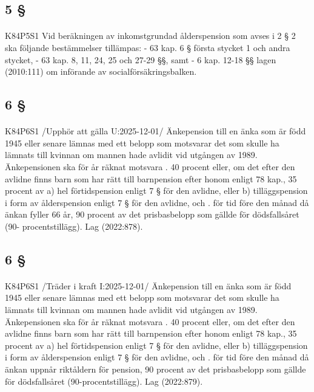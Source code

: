 \documentclass[a4paper,notitlepage,openany,10pt]{book}
\begin{document}
\subsection*{5 §}
\paragraph*{}
{\tiny K84P5S1}
Vid beräkningen av inkomstgrundad ålderspension som avses i 2 § 2 ska följande bestämmelser tillämpas:
\newline - 63 kap. 6 § första stycket 1 och andra stycket,
\newline - 63 kap. 8, 11, 24, 25 och 27-29 §§, samt
\newline - 6 kap. 12-18 §§ lagen (2010:111) om införande av socialförsäkringsbalken.
\subsection*{6 §}
\paragraph*{}
{\tiny K84P6S1}
/Upphör att gälla U:2025-12-01/
Änkepension till en änka som är född 1945 eller senare lämnas med ett belopp som motsvarar det som skulle ha lämnats till kvinnan om mannen hade avlidit vid utgången av 1989. Änkepensionen ska för år räknat motsvara
. 40 procent eller, om det efter den avlidne finns barn som har rätt till barnpension efter honom enligt 78 kap., 35 procent av
a) hel förtidspension enligt 7 § för den avlidne, eller
b) tilläggspension i form av ålderspension enligt 7 § för den avlidne, och
. för tid före den månad då änkan fyller 66 år, 90 procent av det prisbasbelopp som gällde för dödsfallsåret (90- procentstillägg).
Lag (2022:878).
\subsection*{6 §}
\paragraph*{}
{\tiny K84P6S1}
/Träder i kraft I:2025-12-01/
Änkepension till en änka som är född 1945 eller senare lämnas med ett belopp som motsvarar det som skulle ha lämnats till kvinnan om mannen hade avlidit vid utgången av 1989. Änkepensionen ska för år räknat motsvara
. 40 procent eller, om det efter den avlidne finns barn som har rätt till barnpension efter honom enligt 78 kap., 35 procent av
a) hel förtidspension enligt 7 § för den avlidne, eller
b) tilläggspension i form av ålderspension enligt 7 § för den avlidne, och
. för tid före den månad då änkan uppnår riktåldern för pension, 90 procent av det prisbasbelopp som gällde för dödsfallsåret (90-procentstillägg).
Lag (2022:879).
\end{document}
